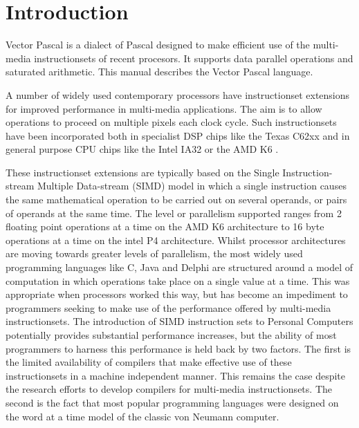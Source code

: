 \chapter*{Introduction}

Vector Pascal is a dialect of Pascal designed to make efficient use of the multi-media
instructionsets of recent procesors. It supports data parallel operations and
saturated arithmetic. This manual describes the Vector Pascal language.

A number of widely used contemporary processors have instructionset extensions
for improved performance in multi-media applications. The aim is to allow operations
to proceed on multiple pixels each clock cycle. Such instructionsets have been
incorporated both in specialist DSP chips like the Texas C62xx\cite{Texas}
and in general purpose CPU chips like the Intel IA32\cite{Intel00} or the AMD
K6 \cite{AMD}.

These instructionset extensions are typically based on the Single Instruction-stream
Multiple Data-stream (SIMD) model in which a single instruction
causes the same mathematical operation to be carried out on several operands,
or pairs of operands at the same time. The level or parallelism supported ranges
from 2 floating point operations at a time on the AMD K6
architecture to 16 byte operations at a time on the intel P4 architecture. Whilst
processor architectures are moving towards greater levels of parallelism, the
most widely used programming languages like C, Java and
Delphi are structured around a model of computation in which
operations take place on a single value at a time. This was appropriate when
processors worked this way, but has become an impediment to programmers seeking
to make use of the performance offered by multi-media instructionsets. The introduction
of SIMD instruction sets\cite{IA32}\cite{Peleg97} to Personal Computers potentially
provides substantial performance increases, but the ability of most programmers
to harness this performance is held back by two factors. The first is the limited
availability of compilers that make effective use of these instructionsets in
a machine independent manner. This remains the case despite the research efforts
to develop compilers for multi-media instructionsets\cite{Cheong97}\cite{Leupers99}\cite{Krall00}\cite{Sreraman00}.
The second is the fact that most popular programming languages were designed
on the word at a time model of the classic von Neumann computer. 

